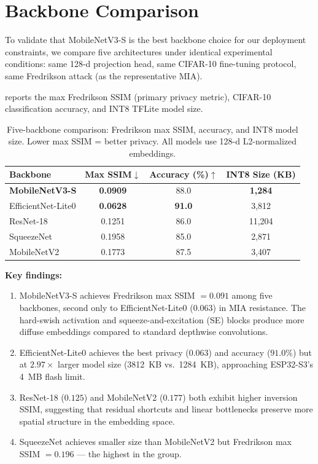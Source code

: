 \documentclass[journal]{IEEEtran}
\newcommand{\MN}{MobileNetV3-S\xspace}
\begin{document}
\section{Backbone Comparison}
\label{sec:backbone}

To validate that \MN is the best backbone choice for our deployment
constraints, we compare five architectures under identical experimental
conditions: same 128-d projection head, same CIFAR-10 fine-tuning
protocol, same Fredrikson attack (as the representative MIA).

 reports the max Fredrikson SSIM (primary privacy
metric), CIFAR-10 classification accuracy, and INT8 TFLite model size.

\begin{table}[tb]
  \centering
  \caption{Five-backbone comparison: Fredrikson max SSIM, accuracy, and INT8 model size.
           Lower max SSIM = better privacy. All models use 128-d L2-normalized embeddings.}
  \label{tab:backbone}
  \begin{tabular}{@{}lccc@{}}
    \toprule
    Backbone & Max SSIM$\downarrow$ & Accuracy (\%)$\uparrow$ & INT8 Size (KB) \\
    \midrule
    \textbf{\MN}       & \textbf{0.0909} & 88.0 & \textbf{1,284} \\
    EfficientNet-Lite0 & \textbf{0.0628} & \textbf{91.0} & 3,812 \\
    ResNet-18          & 0.1251          & 86.0 & 11,204 \\
    SqueezeNet         & 0.1958          & 85.0 & 2,871 \\
    MobileNetV2        & 0.1773          & 87.5 & 3,407 \\
    \bottomrule
  \end{tabular}
\end{table}

\textbf{Key findings:}

\begin{enumerate}
  \item \MN achieves Fredrikson max SSIM $= 0.091$ among five backbones,
    second only to EfficientNet-Lite0 ($0.063$) in MIA resistance.
    The hard-swish activation and squeeze-and-excitation (SE) blocks
    produce more diffuse embeddings compared to standard depthwise convolutions.
  \item EfficientNet-Lite0 achieves the best privacy ($0.063$) and accuracy ($91.0\%$)
    but at $2.97\times$ larger model size (\SI{3812}{KB} vs.\ \SI{1284}{KB}),
    approaching ESP32-S3's \SI{4}{MB} flash limit.
  \item ResNet-18 ($0.125$) and MobileNetV2 ($0.177$) both exhibit
    higher inversion SSIM, suggesting that residual shortcuts and linear
    bottlenecks preserve more spatial structure in the embedding space.
  \item SqueezeNet achieves smaller size than MobileNetV2 but Fredrikson max
    SSIM $= 0.196$ --- the highest in the group.
\end{enumerate}
\end{document}
